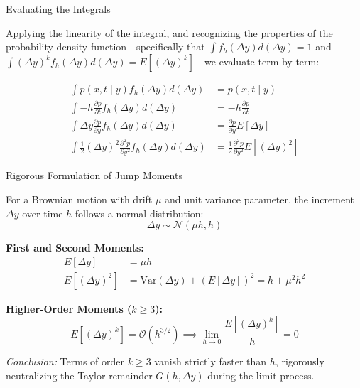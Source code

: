 \documentclass{beamer}
\begin{document}
\begin{frame}{Evaluating the Integrals}

Applying the linearity of the integral, and recognizing the properties of the probability density function—specifically that $\int f_h(\Delta y) d(\Delta y) = 1$ and $\int (\Delta y)^k f_h(\Delta y) d(\Delta y) = E[(\Delta y)^k]$—we evaluate term by term:

\vspace{-0.2cm}
\begin{align*}
\int p(x,t \mid y)f_h(\Delta y)d(\Delta y) &= p(x,t \mid y) \\[1ex]
\int -h\frac{\partial p}{\partial t}f_h(\Delta y)d(\Delta y) &= -h\frac{\partial p}{\partial t} \\[1ex]
\int \Delta y\frac{\partial p}{\partial y}f_h(\Delta y)d(\Delta y) &= \frac{\partial p}{\partial y}E[\Delta y] \\[1ex]
\int \frac{1}{2}(\Delta y)^2\frac{\partial^2 p}{\partial y^2}f_h(\Delta y)d(\Delta y) &= \frac{1}{2}\frac{\partial^2 p}{\partial y^2}E[(\Delta y)^2]
\end{align*}

\end{frame}

\begin{frame}{Rigorous Formulation of Jump Moments}

For a Brownian motion with drift $\mu$ and unit variance parameter, the increment $\Delta y$ over time $h$ follows a normal distribution:
$$\Delta y \sim \mathcal{N}(\mu h, h)$$

\vspace{-0.2cm}
\textbf{First and Second Moments:}
\begin{align*}
E[\Delta y] &= \mu h \\
E[(\Delta y)^2] &= \text{Var}(\Delta y) + (E[\Delta y])^2 = h + \mu^2 h^2
\end{align*}

\vspace{0.2cm}
\textbf{Higher-Order Moments ($k \ge 3$):}
$$E[(\Delta y)^k] = \mathcal{O}(h^{3/2}) \implies \lim_{h \to 0} \frac{E[(\Delta y)^k]}{h} = 0$$

\vspace{0.1cm}
\textit{Conclusion:} Terms of order $k \ge 3$ vanish strictly faster than $h$, rigorously neutralizing the Taylor remainder $G(h, \Delta y)$ during the limit process.

\end{frame}
\end{document}
